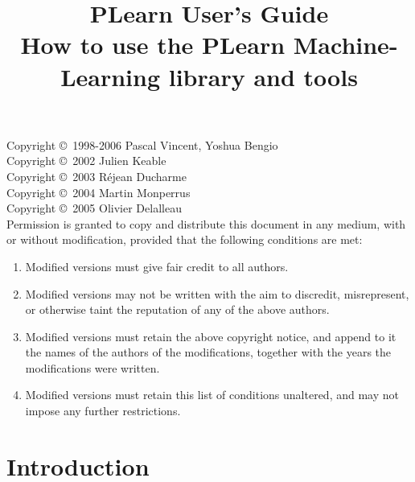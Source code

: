 \documentclass[11pt]{book}
\title{{\Huge PLearn User's Guide\\ \Large How to use the PLearn Machine-Learning library and tools}}
\begin{document}

\maketitle

\vspace*{8cm}

Copyright \copyright\ 1998-2006 Pascal Vincent, Yoshua Bengio \\
Copyright \copyright\ 2002 Julien Keable \\
Copyright \copyright\ 2003 R\'ejean Ducharme \\
Copyright \copyright\ 2004 Martin Monperrus \\
Copyright \copyright\ 2005 Olivier Delalleau \\

Permission is granted to copy and distribute this document in any medium,
with or without modification, provided that the following conditions are
met:

\begin{enumerate}
\item Modified versions must give fair credit to all authors.
\item Modified versions may not be written with the aim to discredit, misrepresent, or otherwise taint the
      reputation of any of the above authors.
\item Modified versions must retain the above copyright notice, and append to
   it the names of the authors of the modifications, together with the years the
   modifications were written.
\item Modified versions must retain this list of conditions unaltered, 
    and may not impose any further restrictions.
\end{enumerate}

\tableofcontents




\chapter*{Introduction}
\end{document}
